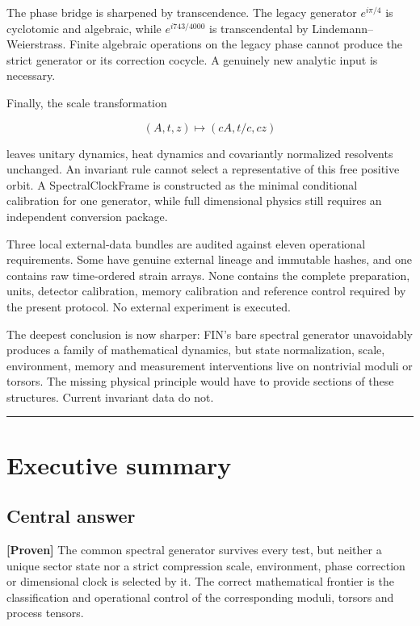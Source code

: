 \documentclass[11pt,a4paper,openany]{report}
\newcommand{\statusProven}{\textcolor{fingreen}{[Proven]}}
\begin{document}
The phase bridge is sharpened by transcendence. The legacy generator \(e^{i\pi/4}\) is cyclotomic and algebraic, while \(e^{i743/4000}\) is transcendental by Lindemann--Weierstrass. Finite algebraic operations on the legacy phase cannot produce the strict generator or its correction cocycle. A genuinely new analytic input is necessary.

Finally, the scale transformation

\[
(A,t,z)\longmapsto(cA,t/c,cz)
\]

leaves unitary dynamics, heat dynamics and covariantly normalized resolvents unchanged. An invariant rule cannot select a representative of this free positive orbit. A SpectralClockFrame is constructed as the minimal conditional calibration for one generator, while full dimensional physics still requires an independent conversion package.

Three local external-data bundles are audited against eleven operational requirements. Some have genuine external lineage and immutable hashes, and one contains raw time-ordered strain arrays. None contains the complete preparation, units, detector calibration, memory calibration and reference control required by the present protocol. No external experiment is executed.

The deepest conclusion is now sharper: FIN's bare spectral generator unavoidably produces a family of mathematical dynamics, but state normalization, scale, environment, memory and measurement interventions live on nontrivial moduli or torsors. The missing physical principle would have to provide sections of these structures. Current invariant data do not.

\par\medskip\hrule\medskip

\chapter{Executive summary}

\section{Central answer}

\textbf{\statusProven{}} The common spectral generator survives every test, but neither a unique sector state nor a strict compression scale, environment, phase correction or dimensional clock is selected by it. The correct mathematical frontier is the classification and operational control of the corresponding moduli, torsors and process tensors.
\end{document}
